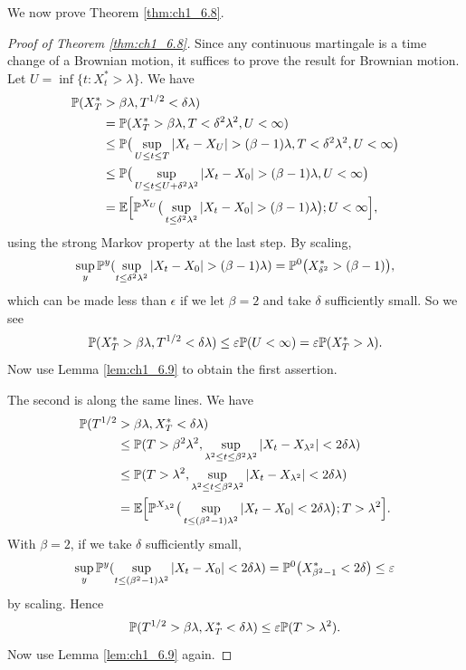 We now prove Theorem \ref{thm:ch1_6.8}.

\begin{proof}[Proof of Theorem \ref{thm:ch1_6.8}]
Since any continuous martingale is a time change of a Brownian motion, it suffices to prove the result for Brownian motion. Let $U = \inf\{t : X_t^* > \lambda\}$. We have
\begin{align*}
    \P(X_T^* &> \beta\lambda, T^{1/2} < \delta\lambda) \\
    &= \P(X_T^* > \beta\lambda, T < \delta^2\lambda^2, U < \infty) \\
    &\leq \P\big(\sup_{U\leq t\leq T} |X_t - X_U| > (\beta-1)\lambda, T<\delta^2\lambda^2, U < \infty\big) \\
    &\leq \P\big(\sup_{U\leq t\leq U+ \delta^2\lambda^2} |X_t - X_0| > (\beta-1)\lambda, U < \infty\big) \\
    &= \E\Big[\P^{X_U}\big(\sup_{t\leq \delta^2\lambda^2} |X_t - X_0| > (\beta-1)\lambda\big); U < \infty\Big],
\end{align*}
using the strong Markov property at the last step. By scaling,
\[
    \sup_y \P^y(\sup_{t\leq \delta^2\lambda^2} |X_t - X_0| > (\beta-1)\lambda) = \P^0\big(X_{\delta^2}^* > (\beta-1)\big),
\]
which can be made less than $\epsilon$ if we let $\beta = 2$ and take $\delta$ sufficiently small. So we see
\[
    \P(X_T^* > \beta\lambda, T^{1/2} < \delta\lambda) \leq \epsilon\P(U < \infty) = \epsilon\P(X_T^* > \lambda).
\]
Now use Lemma \ref{lem:ch1_6.9} to obtain the first assertion.

The second is along the same lines. We have
\begin{align*}
    \P(T^{1/2} &> \beta\lambda, X_T^* < \delta\lambda) \\
    &\leq \P(T > \beta^2\lambda^2, \sup_{\lambda^2\leq t\leq \beta^2\lambda^2}|X_t-X_{\lambda^2}|<2\delta\lambda) \\
    &\leq \P(T > \lambda^2, \sup_{\lambda^2\leq t\leq \beta^2\lambda^2}|X_t-X_{\lambda^2}|<2\delta\lambda) \\
    &= \E\Big[\P^{X_{\lambda^2}}\big(\sup_{t\leq (\beta^2-1)\lambda^2} |X_t - X_0| < 2\delta\lambda\big); T>\lambda^2\Big].
\end{align*}
\mnewpage
With $\beta=2$, if we take $\delta$ sufficiently small,
\[
    \sup_y \P^y(\sup_{t\leq (\beta^2-1)\lambda^2} |X_t - X_0| < 2\delta\lambda) = \P^0\big(X_{\beta^2-1}^* < 2\delta\big)\leq \epsilon
\]
by scaling. Hence
\[
    \P(T^{1/2} > \beta\lambda, X_T^* < \delta\lambda) \leq \epsilon\P(T > \lambda^2).
\]
Now use Lemma \ref{lem:ch1_6.9} again.
\end{proof}

